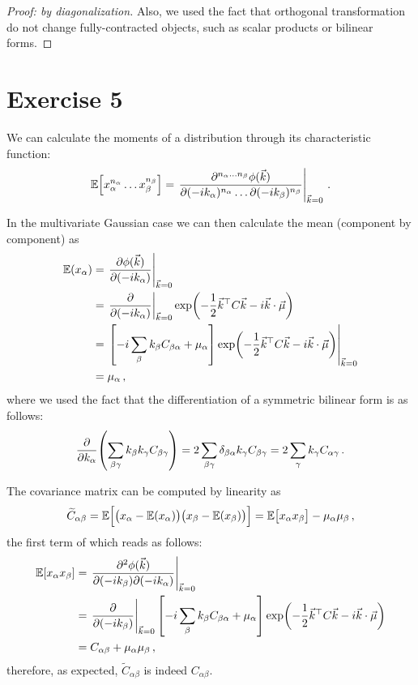 \documentclass[main.tex]{subfiles}
\begin{document}
\begin{proof}[Proof: by diagonalization]
Also, we used the fact that orthogonal transformation do not change fully-contracted objects, such as scalar products or bilinear forms.
\end{proof}

\section*{Exercise 5}

We can calculate the moments of a distribution through its characteristic function: 
%
\begin{align}
\mathbb{E} \qty[x_\alpha^{n_\alpha } \dots x_\beta^{n_\beta }]
= \eval{\frac{\partial^{n_\alpha \dots n_\beta } \phi (\vec{k})}{\partial(- i k_\alpha )^{n_\alpha } \dots \partial(-i k_\beta )^{n_\beta }}}_{\vec{k} = 0}
\,.
\end{align}

In the multivariate Gaussian case we can then calculate the mean (component by component) as 
%
\begin{align}
\mathbb{E}(x_\alpha ) &= \eval{\pdv{\phi (\vec{k})}{(-i k_\alpha )}}_{\vec{k} = 0}  \\
&= \eval{\pdv{}{(-i k_\alpha )}}_{\vec{k} = 0}
\exp(- \frac{1}{2} \vec{k}^{\top} C \vec{k} - i \vec{k} \cdot \vec{\mu })  \\
&= \eval{\qty[- i \sum_\beta  k_\beta  C_{\beta  \alpha } + \mu _\alpha ] \exp(- \frac{1}{2} \vec{k}^{\top} C \vec{k} - i \vec{k} \cdot \vec{\mu })}_{\vec{k} = 0}  \\
&= \mu _\alpha 
\,,
\end{align}
%
where we used the fact that the differentiation of a symmetric bilinear form is as follows: 
%
\begin{align}
\pdv{}{k_\alpha } \qty(\sum _{\beta \gamma } k_\beta k_\gamma C_{\beta \gamma }) = 2 \sum _{\beta \gamma } \delta_{\beta \alpha } k_\gamma C_{\beta \gamma } = 2 \sum_{\gamma } k_\gamma C_{\alpha \gamma }
\,.
\end{align}

The covariance matrix can be computed by linearity as
%
\begin{align}
\widetilde{C}_{\alpha \beta } = \mathbb{E}\qty[\qty(x_ \alpha - \mathbb{E}(x_\alpha )) \qty(x_\beta - \mathbb{E}(x_\beta ))] 
= \mathbb{E}\qty[x_\alpha  x_\beta ] - \mu _\alpha \mu _\beta 
\,,
\end{align}
%
the first term of which reads as follows: 
%
\begin{align}
\mathbb{E}[x_\alpha x_\beta ] &= \eval{\pdv[2]{\phi (\vec{k})}{(-i k_\beta  )}{(-i k_\alpha  )}}_{\vec{k} = 0}  \\
&= \eval{\pdv{}{(-i k_\beta )}}_{\vec{k} = 0} \qty[-i \sum _{\beta } k_\beta C_{\beta \alpha } + \mu _\alpha ] \exp(- \frac{1}{2} \vec{k}^{\top} C \vec{k} - i \vec{k} \cdot \vec{\mu })  \\
&= C_{\alpha \beta } + \mu _\alpha \mu _\beta 
\,,
\end{align}
%
therefore, as expected, \(\widetilde{C}_{\alpha \beta }\) is indeed \(C_{\alpha \beta }\). 
\end{document}
